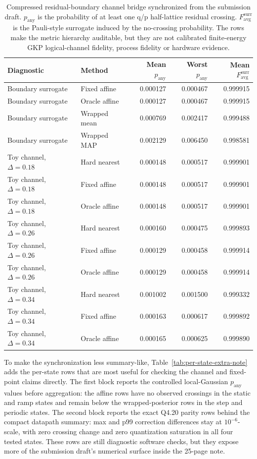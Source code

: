 \documentclass[11pt]{article}
\begin{document}
\begin{table}[ht]
\centering
\scriptsize
\setlength{\tabcolsep}{3pt}
\begin{tabular}{llrrr}
\toprule
Diagnostic & Method & Mean \(p_{\mathrm{any}}\) & Worst \(p_{\mathrm{any}}\) & Mean \(F_{\mathrm{avg}}^{\mathrm{surr}}\) \\
\midrule
Boundary surrogate & Fixed affine & 0.000127 & 0.000467 & 0.999915 \\
Boundary surrogate & Oracle affine & 0.000127 & 0.000467 & 0.999915 \\
Boundary surrogate & Wrapped mean & 0.000769 & 0.002417 & 0.999488 \\
Boundary surrogate & Wrapped MAP & 0.002129 & 0.006450 & 0.998581 \\
Toy channel, \(\Delta=0.18\) & Hard nearest & 0.000148 & 0.000517 & 0.999901 \\
Toy channel, \(\Delta=0.18\) & Fixed affine & 0.000148 & 0.000517 & 0.999901 \\
Toy channel, \(\Delta=0.18\) & Oracle affine & 0.000148 & 0.000517 & 0.999901 \\
Toy channel, \(\Delta=0.26\) & Hard nearest & 0.000160 & 0.000475 & 0.999893 \\
Toy channel, \(\Delta=0.26\) & Fixed affine & 0.000129 & 0.000458 & 0.999914 \\
Toy channel, \(\Delta=0.26\) & Oracle affine & 0.000129 & 0.000458 & 0.999914 \\
Toy channel, \(\Delta=0.34\) & Hard nearest & 0.001002 & 0.001500 & 0.999332 \\
Toy channel, \(\Delta=0.34\) & Fixed affine & 0.000163 & 0.000617 & 0.999892 \\
Toy channel, \(\Delta=0.34\) & Oracle affine & 0.000165 & 0.000625 & 0.999890 \\
\bottomrule
\end{tabular}
\caption{Compressed residual-boundary channel bridge synchronized from the
submission draft.  \(p_{\mathrm{any}}\) is the probability of at least one
q/p half-lattice residual crossing.  \(F_{\mathrm{avg}}^{\mathrm{surr}}\) is
the Pauli-style surrogate induced by the no-crossing probability.  The rows
make the metric hierarchy auditable, but they are not calibrated finite-energy
GKP logical-channel fidelity, process fidelity or hardware evidence.}
\label{tab:channel-bridge-note}
\end{table}

To make the synchronization less summary-like, Table~\ref{tab:per-state-extra-note}
adds the per-state rows that are most useful for checking the channel and
fixed-point claims directly.  The first block reports the controlled
local-Gaussian \(p_{\mathrm{any}}\) values before aggregation: the affine rows
have no observed crossings in the static and ramp states and remain below the
wrapped-posterior rows in the step and periodic states.  The second block
reports the exact Q4.20 parity rows behind the compact datapath summary: max
and p99 correction differences stay at \(10^{-6}\)-scale, with zero crossing
change and zero quantization saturation in all four tested states.  These rows
are still diagnostic software checks, but they expose more of the submission
draft's numerical surface inside the 25-page note.
\end{document}
